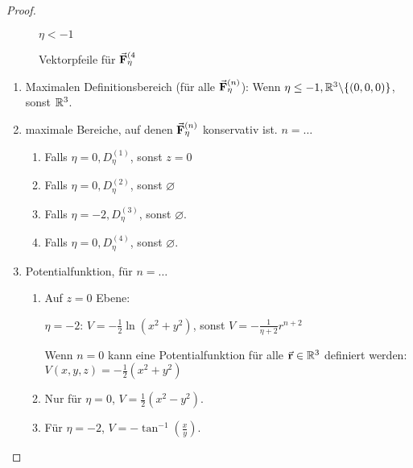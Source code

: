 \begin{proof}
\begin{figure}[h!]
\begin{subcaptionbox}{$\eta<-1$}
		{}
	\end{subcaptionbox}
	\caption{Vektorpfeile f\"{u}r $\va F_\eta^{(4}$}
\end{figure}
\begin{enumerate}
	\item Maximalen Definitionsbereich (f\"{u}r alle $\va F_\eta^{(n)}$): Wenn $\eta\le -1, \mathbb{R}^3\backslash \{(0,0,0)\}$, sonst $\mathbb{R}^3$.
	\item maximale Bereiche, auf denen $\va F_\eta^{(n)}$ konservativ ist. $n=\dots$
	\begin{enumerate}[label=(\arabic*)]
		\item Falls $\eta=0,D_\eta^{(1)}$, sonst $z=0$
		\item Falls $\eta=0, D_\eta^{(2)}$, sonst $\varnothing$
		\item Falls $\eta=-2, D_\eta^{(3)}$, sonst $\varnothing$.
		\item Falls $\eta=0, D_\eta^{(4)}$, sonst $\varnothing$.
	\end{enumerate}
	\item Potentialfunktion, f\"{u}r $n=\dots$
	\begin{enumerate}[label=(\arabic*)]
		\item Auf $z=0$ Ebene:
		
		$\eta=-2$: $V=-\frac 12\ln\left(x^2+y^2\right)$, sonst $V=-\frac 1{\eta+2}r^{n+2}$

		Wenn $n=0$ kann eine Potentialfunktion f\"{u}r alle $\va r\in\mathbb{R}^3$ definiert werden: $V(x,y,z)=-\frac{1}{2}\left( x^2+y^2 \right) $

	\item Nur f\"{u}r $\eta=0$, $V=\frac{1}{2}\left( x^2-y^2 \right) $.
	\item F\"{u}r $\eta=-2$, $V=-\tan^{-1}\left( \frac{x}{y} \right) $.


\end{enumerate}
\end{enumerate}
\end{proof}
